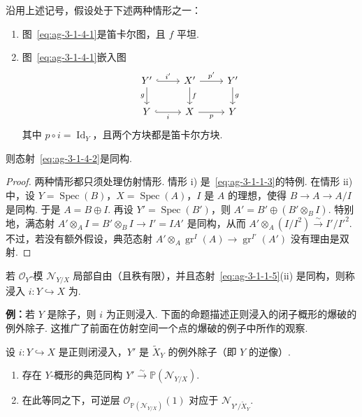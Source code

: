 \begin{proposition}\label{item:ag-3-1-5}
沿用上述记号，假设处于下述两种情形之一：
\begin{enumerate}[label=\roman*)]
\item 图~\eqref{eq:ag-3-1-4-1}是笛卡尔图，且 $f$ 平坦.
\item 图~\eqref{eq:ag-3-1-4-1}嵌入图
\begin{align*}
\begin{tikzcd}[ampersand replacement=\&]
Y'\arrow[r,hook,"i'"]\arrow[d,"g"'] \& X'\arrow[r,"p'"]\arrow[d,"f"] \& Y'\arrow[d,"g"]\\
Y\arrow[r,hook,"i"'] \& X\arrow[r,"p"'] \& Y
\end{tikzcd}
\end{align*}
其中 $p\circ i=\operatorname{Id}_Y$，且两个方块都是笛卡尔方块.
\end{enumerate}
则态射~\eqref{eq:ag-3-1-4-2}是同构.
\end{proposition}
\begin{proof}
两种情形都只须处理仿射情形. 情形 i) 是~\eqref{eq:ag-3-1-1-3}的特例. 在情形 ii) 中，设 $Y=\operatorname{Spec}(B)$，$X=\operatorname{Spec}(A)$，$I$ 是 $A$ 的理想，使得 $B\longrightarrow A\longrightarrow A/I$ 是同构. 于是 $A=B\oplus I$. 再设 $Y'=\operatorname{Spec}(B')$，则 $A'=B'\oplus(B'\otimes_BI)$. 特别地，满态射 $A'\otimes_AI=B'\otimes_BI\longrightarrow I'=IA'$ 是同构，从而 $A'\otimes_A(I/I^2)\xrightarrow\sim I'/I'^2$. 不过，若没有额外假设，典范态射 $A'\otimes_A\operatorname{gr}^{I}(A)\longrightarrow\operatorname{gr}^{I'}(A')$ 没有理由是双射.
\end{proof}
\begin{definition}\label{item:ag-3-1-6}
若 $\mathcal O_Y$-模 $\mathcal N_{Y/X}$ 局部自由（且秩有限），并且态射~\eqref{eq:ag-3-1-1-5}(ii) 是同构，则称浸入 $i:Y\hookrightarrow X$ 为.
\end{definition}
\noindent\textbf{例：}若 $Y$ 是除子，则 $i$ 为正则浸入.
下面的命题描述正则浸入的闭子概形的爆破的例外除子. 这推广了前面在仿射空间一个点的爆破的例子中所作的观察.
\begin{proposition}\label{item:ag-3-1-7}
设 $i:Y\hookrightarrow X$ 是正则闭浸入，$Y'$ 是 $\widetilde X_Y$ 的例外除子（即 $Y$ 的逆像）.
\begin{enumerate}[label=\roman*)]
\item 存在 $Y$-概形的典范同构 $Y'\xrightarrow\sim\mathbb P(\mathcal N_{Y/X})$.
\item 在此等同之下，可逆层 $\mathcal O_{\mathbb P(\mathcal N_{Y/X})}(1)$ 对应于 $\mathcal N_{Y'/\widetilde X_Y}$.
\end{enumerate}
\end{proposition}
